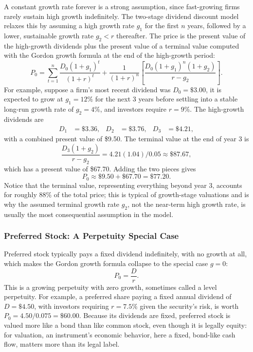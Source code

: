 \documentclass[../ai_in_finance]{subfiles}
\begin{document}
A constant growth rate forever is a strong assumption, since fast-growing firms rarely sustain high growth indefinitely. The two-stage dividend discount model relaxes this by assuming a high growth rate $g_1$ for the first $n$ years, followed by a lower, sustainable growth rate $g_2 < r$ thereafter. The price is the present value of the high-growth dividends plus the present value of a terminal value computed with the Gordon growth formula at the end of the high-growth period:
\begin{equation*}
P_0 = \sum_{t=1}^{n} \frac{D_0(1+g_1)^t}{(1+r)^t} + \frac{1}{(1+r)^n}\left[\frac{D_0(1+g_1)^n(1+g_2)}{r-g_2}\right].
\end{equation*}
For example, suppose a firm's most recent dividend was $D_0 = \$3.00$, it is expected to grow at $g_1=12\%$ for the next 3 years before settling into a stable long-run growth rate of $g_2=4\%$, and investors require $r=9\%$. The high-growth dividends are
\begin{align*}
D_1 &= \$3.36, & D_2 &= \$3.76, & D_3 &= \$4.21,
\end{align*}
with a combined present value of \$9.50. The terminal value at the end of year 3 is
\begin{equation*}
\frac{D_3(1+g_2)}{r-g_2} = 4.21(1.04)/0.05 \approx \$87.67,
\end{equation*}
which has a present value of \$67.70. Adding the two pieces gives
\begin{equation*}
P_0 \approx \$9.50 + \$67.70 = \$77.20.
\end{equation*}
Notice that the terminal value, representing everything beyond year 3, accounts for roughly 88\% of the total price; this is typical of growth-stage valuations and is why the assumed terminal growth rate $g_2$, not the near-term high growth rate, is usually the most consequential assumption in the model.

\subsubsection*{Preferred Stock: A Perpetuity Special Case}

Preferred stock typically pays a fixed dividend indefinitely, with no growth at all, which makes the Gordon growth formula collapse to the special case $g=0$:
\begin{equation*}
P_0 = \frac{D}{r}.
\end{equation*}
This is a growing perpetuity with zero growth, sometimes called a level perpetuity. For example, a preferred share paying a fixed annual dividend of $D=\$4.50$, with investors requiring $r=7.5\%$ given the security's risk, is worth $P_0 = 4.50/0.075 = \$60.00$. Because its dividends are fixed, preferred stock is valued more like a bond than like common stock, even though it is legally equity: for valuation, an instrument's economic behavior, here a fixed, bond-like cash flow, matters more than its legal label.
\end{document}

